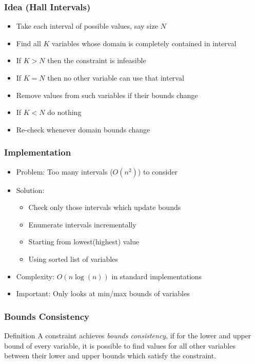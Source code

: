 

\begin{frame}
\frametitle{Idea (Hall Intervals)}
\begin{itemize}
\item Take each interval of possible values, say size $N$
\item Find all $K$ variables whose domain is completely contained in interval
\item If $K>N$ then the constraint is infeasible
\item If $K=N$ then no other variable can use that interval
\item Remove values from such variables if their bounds change
\item If $K<N$ do nothing
\item Re-check whenever domain bounds change
\end{itemize}
\end{frame}

\begin{frame}
\frametitle{Implementation}
\begin{itemize}
\item Problem: Too many intervals ($O(n^2)$) to consider
\item Solution:
\begin{itemize}
\item Check only those intervals which update bounds
\item Enumerate intervals incrementally
\item Starting from lowest(highest) value
\item Using sorted list of variables
\end{itemize}
\item Complexity: $O(n\log(n))$ in standard implementations
\item Important: Only looks at min/max bounds of variables
\end{itemize}
\end{frame}

\begin{frame}
\frametitle{Bounds Consistency}
\begin{block}{Definition}
A constraint achieves {\em bounds consistency}, if for the lower and upper bound of every variable, it is possible to find values for all other variables between their lower and upper bounds which satisfy the constraint.
\end{block}
\end{frame}

